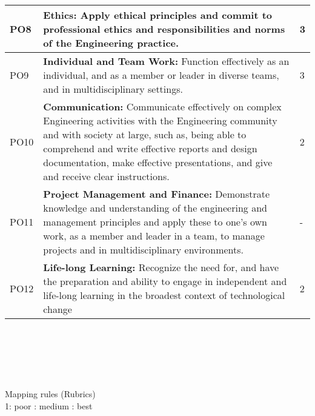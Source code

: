 \section*{\centering}
	\begin{tabular}{|p{1cm}|p{12cm}|p{2cm}|}
 
			\hline
			PO8 &\textbf{Ethics:}   Apply ethical principles and commit to professional ethics and 
responsibilities and norms of the Engineering practice.
    & 3 \\ \hline
			PO9 &\textbf{Individual and Team Work: }   Function effectively as an individual, and as
a member or leader in diverse teams, and in multidisciplinary settings.
 &  3\\ \hline
			PO10&\textbf{Communication:}   Communicate effectively on complex Engineering
activities with the Engineering community and with society at large, such
as, being able to comprehend and write effective reports and design
documentation, make effective presentations, and give and receive clear
instructions.& 2\\ \hline
			PO11 &\textbf{Project Management and Finance: }  Demonstrate knowledge and understanding of the engineering and management principles and apply these to one’s own work, as a member and leader in a team, to manage projects and in multidisciplinary environments. &  -\\ \hline
			PO12&\textbf{Life-long Learning:}  Recognize the need for, and have the preparation and ability to engage in independent and life-long learning in the broadest context of technological change& 2\\ \hline
		\end{tabular}
\\
\\
\\
\\
\\ Mapping rules (Rubrics)
\\
1: poor  : medium : best
